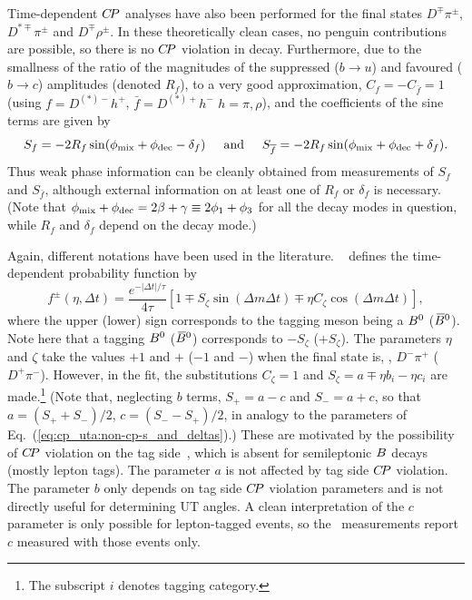 Time-dependent $C\!P$ analyses have also been performed for the
final states $D^{\mp}\pi^{\pm}$, $D^{*\mp}\pi^{\pm}$ and $D^{\mp}\rho^{\pm}$.
In these theoretically clean cases, no penguin contributions are possible,
so there is no $C\!P$ violation in decay.
Furthermore, due to the smallness of the ratio of the magnitudes of the 
suppressed ($b \to u$) and favoured ($b \to c$) amplitudes (denoted $R_f$),
to a very good approximation, $C_f = - C_{\bar{f}} = 1$
(using $f = D^{(*)-}h^+$, $\bar{f} = D^{(*)+}h^-$ $h = \pi,\rho$),
and the coefficients of the sine terms are given by
\begin{equation}
  S_f = - 2 R_f \sin( \phi_{\rm mix} + \phi_{\rm dec} - \delta_f )
  \hspace{5mm}
  {\rm and}
  \hspace{5mm}
  S_{\bar{f}} = - 2 R_f \sin( \phi_{\rm mix} + \phi_{\rm dec} + \delta_f ).
\end{equation}
Thus weak phase information can be cleanly obtained from measurements
of $S_f$ and $S_{\bar{f}}$, 
although external information on at least one of $R_f$ or $\delta_f$ is necessary.
(Note that $\phi_{\rm mix} + \phi_{\rm dec} = 2\beta + \gamma \equiv 2\phi_1 + \phi_3$ for all the decay modes 
in question, while $R_f$ and $\delta_f$ depend on the decay mode.)

Again, different notations have been used in the literature.
\babar~\cite{Aubert:2006tw,Aubert:2005yf}
defines the time-dependent probability function by
\begin{equation}
  f^\pm (\eta, \Delta t) = \frac{e^{-|\Delta t|/\tau}}{4\tau} 
  \left[  
    1 \mp S_\zeta \sin (\Delta m \Delta t) \mp \eta C_\zeta \cos(\Delta m \Delta t) 
  \right],
\end{equation} 
where the upper (lower) sign corresponds to 
the tagging meson being a $B^0$ ($\kern 0.18em\overline{\kern -0.18em B}{}^0$). 
Note here that a tagging $B^0$ ($\kern 0.18em\overline{\kern -0.18em B}{}^0$) corresponds to $-S_\zeta$ ($+S_\zeta$).
The parameters $\eta$ and $\zeta$ take the values $+1$ and $+$ ($-1$ and $-$) 
when the final state is, \eg, $D^-\pi^+$ ($D^+\pi^-$). 
However, in the fit, the substitutions $C_\zeta = 1$ and 
$S_\zeta = a \mp \eta b_i - \eta c_i$ are made.\footnote{
  The subscript $i$ denotes tagging category.
}
(Note that, neglecting $b$ terms, $S_+ = a - c$ and $S_- = a + c$, 
so that $a = (S_+ + S_-)/2$, $c = (S_- - S_+)/2$, in analogy to 
the parameters of Eq.~(\ref{eq:cp_uta:non-cp-s_and_deltas}).)
These are motivated by the possibility of 
$C\!P$ violation on the tag side~\cite{Long:2003wq}, 
which is absent for semileptonic $B$ decays (mostly lepton tags). 
The parameter $a$ is not affected by tag side $C\!P$ violation. 
The parameter $b$ only depends on tag side $C\!P$ violation parameters 
and is not directly useful for determining UT angles.
A clean interpretation of the $c$ parameter is only possible for 
lepton-tagged events,
so the \babar\ measurements report $c$ measured with those events only.

